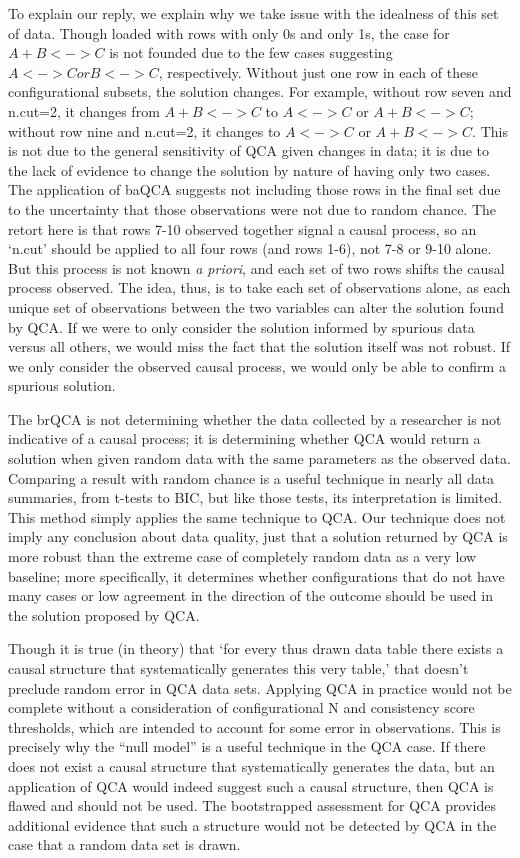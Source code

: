 \documentclass[12pt,stdletter,dateno,sigleft]{newlfm} %
\begin{document}
\begin{newlfm}
To explain our reply, we explain why we take issue with the idealness of this set of data. Though loaded with rows with only 0s and only 1s, the case for $A + B <-> C$ is not founded due to the few cases suggesting $A <-> C or B <-> C$, respectively. Without just one row in each of these configurational subsets, the solution changes. For example, without row seven and n.cut=2, it changes from $A + B <-> C$ to  $A <-> C$ or $A + B <-> C$; without row nine and n.cut=2, it changes to $A <-> C$ or $A + B <-> C$. This is not due to the general sensitivity of QCA given changes in data; it is due to the lack of evidence to change the solution by nature of having only two cases. The application of baQCA suggests not including those rows in the final set due to the uncertainty that those observations were not due to random chance. The retort here is that rows 7-10 observed together signal a causal process, so an `n.cut' should be applied to all four rows (and rows 1-6), not 7-8 or 9-10 alone. But this process is not known {\it{a priori}}, and each set of two rows shifts the causal process observed.   \newpage The idea, thus, is to take each set of observations alone, as each unique set of observations between the two variables can alter the solution found by QCA. If we were to only consider the solution informed by spurious data versus all others, we would miss the fact that the solution itself was not robust. If we only consider the observed causal process, we would only be able to confirm a spurious solution.

The brQCA is not determining whether the data collected by a researcher is not indicative of a causal process; it is determining whether QCA would return a solution when given random data with the same parameters as the observed data. Comparing a result with random chance is a useful technique in nearly all data summaries, from t-tests to BIC, but like those tests, its interpretation is limited. This method simply applies the same technique to QCA. Our technique does not imply any conclusion about data quality, just that a solution returned by QCA is more robust than the extreme case of completely random data as a very low baseline; more specifically, it determines whether configurations that do not have many cases or low agreement in the direction of the outcome should be used in the solution proposed by QCA. 

Though it is true (in theory) that `for every thus drawn data table there exists a causal structure that systematically generates this very table,' that doesn't preclude random error in QCA data sets. Applying QCA in practice would not be complete without a consideration of configurational N and consistency score thresholds, which are intended to account for some error in observations. This is precisely why the ``null model'' is a useful technique in the QCA case. If there does not exist a causal structure that systematically generates the data, but an application of QCA would indeed suggest such a causal structure, then QCA is flawed and should not be used. The bootstrapped assessment for QCA provides additional evidence that such a structure would not be detected by QCA in the case that a random data set is drawn.


\end{newlfm}
\end{document}
